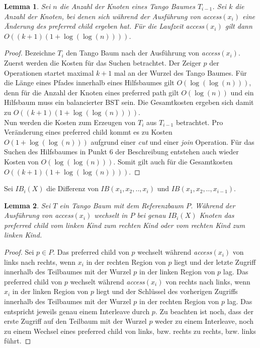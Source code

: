 \documentclass[a4paper,12pt]{article}
\newtheorem{Lemma}{Lemma}[section]
\begin{document}
 
\begin{Lemma} \label{demaineLemma4}
	Sei $n$ die Anzahl der Knoten eines Tango Baumes $T_{i-1}$. Sei $k$ die Anzahl der Knoten, bei denen sich während der Ausführung von \textit{access}$\left(x_i\right)$ eine Änderung des preferred child ergeben hat. Für die Laufzeit \textit{access}$\left(x_i\right)$ gilt dann $O\left(\left(k + 1\right) \left(1 + \log \left( \log  \left(n \right)\right)\right)\right)$.
\end{Lemma}
\begin{proof}
	Bezeichne $T_i$ den Tango Baum nach der Ausführung von \textit{access}$\left(x_i\right)$. Zuerst werden die Kosten für das Suchen betrachtet. Der Zeiger $p$ der Operationen startet maximal $k + 1$ mal an der Wurzel des Tango Baumes. Für die Länge eines Pfades innerhalb eines Hilfsbaumes gilt $O\left(\log \left( \log  \left(n \right)\right)\right)$, denn für die Anzahl der Knoten eines preferred path gilt $O\left( \log \left(n\right)  \right)$ und ein Hilfsbaum muss ein balancierter BST sein. Die Gesamtkosten ergeben sich damit zu $O\left(\left(k + 1\right) \left(1 + \log \left( \log  \left(n \right)\right)\right)\right)$.\\
	Nun werden die Kosten zum Erzeugen von $T_i$ aus $T_{i-1}$ betrachtet. Pro Veränderung eines preferred child kommt es zu Kosten $O\left(1 + \log\left(\log \left(n\right)\right)\right)$ aufgrund einer \textit{cut} und einer \textit{join} Operation. Für das Suchen des Hilfsbaumes in Punkt $6$ der Beschreibung entstehen auch wieder Kosten von $O\left(\log \left( \log  \left(n \right)\right)\right)$. Somit gilt auch für die Gesamtkosten $O\left(\left(k + 1\right) \left(1 + \log \left( \log  \left(n \right)\right)\right)\right)$.
	
	
\end{proof}
\noindent Sei $\mathit{IB}_i\left(X\right)$ die Differenz von $\mathit{IB}\left(x_1, x_2,..,x_i\right)$ und  $\mathit{IB}\left(x_1, x_2,..,x_{i-1}\right)$. 

\begin{Lemma} \label{demaineLemma5}
	Sei $T$ ein Tango Baum mit dem Referenzbaum $P$. 
	Während der Ausführung von \textit{access}$\left(x_i\right)$ wechselt in $P$ bei genau $\mathit{IB}_i\left(X\right)$ Knoten das preferred child vom linken Kind zum rechten Kind oder vom rechten Kind zum linken Kind.
\end{Lemma}
\begin{proof}
	Sei $p \in P$. Das preferred child von $p$ wechselt während  \textit{access}$\left(x_i\right)$ von links nach rechts,  wenn $x_i$ in der rechten Region von $p$ liegt und der letzte Zugriff innerhalb des Teilbaumes mit der Wurzel $p$ in der linken Region von $p$ lag.  Das preferred child von $p$ wechselt während  \textit{access}$\left(x_i\right)$ von rechts nach links,  wenn $x_i$ in der linken Region von $p$ liegt und der Schlüssel des vorherigen Zugriffs innerhalb des Teilbaumes mit der Wurzel $p$ in der rechten Region von $p$ lag. Das entspricht jeweils genau einem Interleave durch $p$. Zu beachten ist noch, dass der erste Zugriff auf den Teilbaum mit der Wurzel $p$ weder zu einem Interleave, noch zu einem Wechsel eines preferred child von links, bzw. rechts zu rechts, bzw. links führt. 	
\end{proof}
\end{document}
